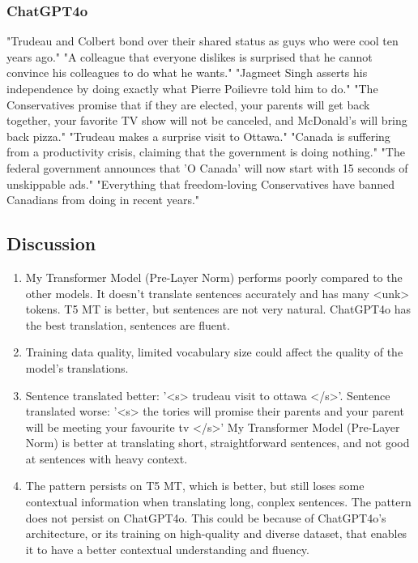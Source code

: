 \documentclass[11pt]{article}
\begin{document}
\subsubsection{ChatGPT4o}
"Trudeau and Colbert bond over their shared status as guys who were cool ten years ago."\newline
"A colleague that everyone dislikes is surprised that he cannot convince his colleagues to do what he wants."\newline
"Jagmeet Singh asserts his independence by doing exactly what Pierre Poilievre told him to do."\newline
"The Conservatives promise that if they are elected, your parents will get back together, your favorite TV show will not be canceled, and McDonald’s will bring back pizza."\newline
"Trudeau makes a surprise visit to Ottawa."\newline
"Canada is suffering from a productivity crisis, claiming that the government is doing nothing."\newline
"The federal government announces that 'O Canada' will now start with 15 seconds of unskippable ads."\newline
"Everything that freedom-loving Conservatives have banned Canadians from doing in recent years."\newline


\subsection{Discussion}
{\it 
\begin{enumerate}
  \item My Transformer Model (Pre-Layer Norm) performs poorly compared to the other models. It doesn't translate sentences accurately and has many <unk> tokens. T5 MT is better, but sentences are not very natural. ChatGPT4o has the best translation, sentences are fluent.
  \item Training data quality, limited vocabulary size could affect the quality of the model's translations.
  \item Sentence translated better: '<s> trudeau visit to ottawa </s>'. Sentence translated worse: '<s> the tories will promise their parents and your parent will be meeting your favourite tv </s>'
        My Transformer Model (Pre-Layer Norm) is better at translating short, straightforward sentences, and not good at sentences with heavy context.
  \item The pattern persists on T5 MT, which is better, but still loses some contextual information when translating long, conplex sentences. The pattern does not persist on ChatGPT4o.
        This could be because of ChatGPT4o’s architecture, or its training on high-quality and diverse dataset, that enables it to have a better contextual understanding and fluency.
\end{enumerate}
}
\end{document}
